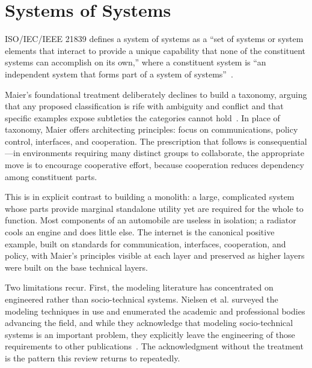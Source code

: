 \documentclass[11pt,a4paper]{article}
\begin{document}
\section{Systems of Systems}
\label{sec:sos}

ISO/IEC/IEEE 21839 defines a system of systems as a ``set of systems or system
elements that interact to provide a unique capability that none of the
constituent systems can accomplish on its own,'' where a constituent system is
``an independent system that forms part of a system of systems''~\citep{iso21839}.

Maier's foundational treatment deliberately declines to build a taxonomy,
arguing that any proposed classification is rife with ambiguity and conflict and
that specific examples expose subtleties the categories cannot
hold~\citep{maier1998}. In place of taxonomy, Maier offers architecting
principles: focus on communications, policy control, interfaces, and
cooperation. The prescription that follows is consequential---in environments
requiring many distinct groups to collaborate, the appropriate move is to
encourage cooperative effort, because cooperation reduces dependency among
constituent parts.

This is in explicit contrast to building a monolith: a large, complicated system
whose parts provide marginal standalone utility yet are required for the whole
to function. Most components of an automobile are useless in isolation; a
radiator cools an engine and does little else. The internet is the canonical
positive example, built on standards for communication, interfaces, cooperation,
and policy, with Maier's principles visible at each layer and preserved as
higher layers were built on the base technical layers.

Two limitations recur. First, the modeling literature has concentrated on
engineered rather than socio-technical systems. Nielsen et al. surveyed the
modeling techniques in use and enumerated the academic and professional bodies
advancing the field, and while they acknowledge that modeling socio-technical
systems is an important problem, they explicitly leave the engineering of those
requirements to other publications~\citep{nielsen2015}. The acknowledgment
without the treatment is the pattern this review returns to repeatedly.
\end{document}
